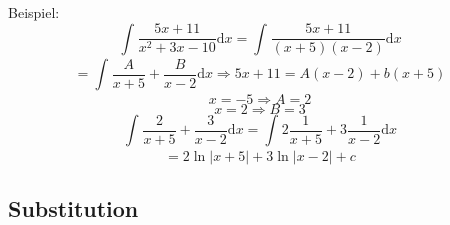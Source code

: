 \documentclass{article}
\begin{document}
Beispiel:
$$ \int_{}^{} \frac{5x+11}{x^{2}+3x-10} \mathrm{d}x = \int_{}^{} \frac{5x+11}{(x+5)(x-2)}  \mathrm{d}x $$
$$= \int_{}^{} \frac{A}{x+5} + \frac{B}{x-2}  \mathrm{d}x \Rightarrow 5x+11 = A(x-2)+b(x+5)$$
$$x = -5 \Rightarrow A = 2$$
$$x=2 \Rightarrow B = 3$$
$$ \int_{}^{} \frac{2}{x+5} + \frac{3}{x-2}  \mathrm{d}x = \int_{}^{} 2 \frac{1}{x+5} + 3 \frac{1}{x-2}  \mathrm{d}x $$
$$=2 \ln |x+5|+ 3\ln|x-2|+c$$


\subsection{Substitution}
\end{document}
